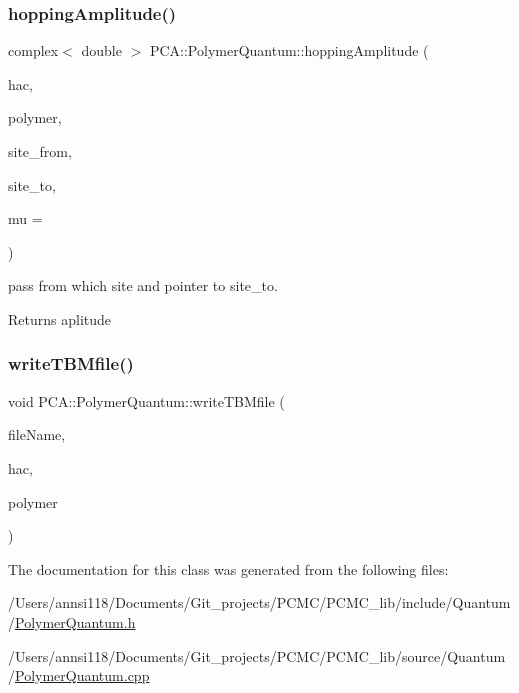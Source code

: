 \subsubsection{\texorpdfstring{hopping\+Amplitude()}{hoppingAmplitude()}}
{\footnotesize\ttfamily complex$<$ double $>$ P\+C\+A\+::\+Polymer\+Quantum\+::hopping\+Amplitude (\begin{DoxyParamCaption}\item[{const \hyperlink{class_p_c_a_1_1_hopping_amplitude_calculator}{Hopping\+Amplitude\+Calculator} \&}]{hac,  }\item[{const \hyperlink{class_p_c_a_1_1_polymer}{Polymer} \&}]{polymer,  }\item[{int}]{site\+\_\+from,  }\item[{int}]{site\+\_\+to,  }\item[{double}]{mu = {} }\end{DoxyParamCaption})\hspace{0.3cm}{\ttfamily [static]}}



pass from which site and pointer to site\+\_\+to. 

Returns aplitude \hypertarget{class_p_c_a_1_1_polymer_quantum_ac035f7bd1e3f5779d82048af7794e05d}{}\label{class_p_c_a_1_1_polymer_quantum_ac035f7bd1e3f5779d82048af7794e05d} 
\subsubsection{\texorpdfstring{write\+T\+B\+Mfile()}{writeTBMfile()}}
{\footnotesize\ttfamily void P\+C\+A\+::\+Polymer\+Quantum\+::write\+T\+B\+Mfile (\begin{DoxyParamCaption}\item[{char $\ast$}]{file\+Name,  }\item[{const \hyperlink{class_p_c_a_1_1_hopping_amplitude_calculator}{Hopping\+Amplitude\+Calculator} \&}]{hac,  }\item[{const \hyperlink{class_p_c_a_1_1_polymer}{Polymer} \&}]{polymer }\end{DoxyParamCaption})\hspace{0.3cm}{\ttfamily [static]}}



The documentation for this class was generated from the following files\+:\begin{DoxyCompactItemize}
\item 
/\+Users/annsi118/\+Documents/\+Git\+\_\+projects/\+P\+C\+M\+C/\+P\+C\+M\+C\+\_\+lib/include/\+Quantum/\hyperlink{_polymer_quantum_8h}{Polymer\+Quantum.\+h}\item 
/\+Users/annsi118/\+Documents/\+Git\+\_\+projects/\+P\+C\+M\+C/\+P\+C\+M\+C\+\_\+lib/source/\+Quantum/\hyperlink{_polymer_quantum_8cpp}{Polymer\+Quantum.\+cpp}\end{DoxyCompactItemize}
